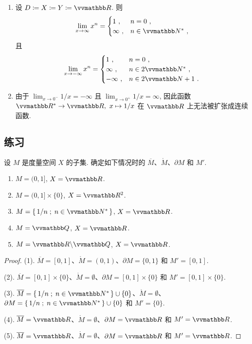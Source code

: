 \begin{example}
\begin{enumerate}
\begin{proof}
        \end{proof}
        \item 设 \(D \coloneqq X \coloneqq Y \coloneqq \R\). 则
        \[
            \lim_{x \to \infty} x^n =
            \begin{cases}
                1\ ,      & n = 0\ , \\
                \infty\ , & n \in \N^\ast\ ,
            \end{cases}
        \]
        且
        \[
            \lim_{x \to - \infty} x^n =
            \begin{cases}
                1\ ,        & n = 0\ , \\
                \infty\ ,   & n \in 2 \N^\ast\ , \\
                - \infty\ , & n \in 2 \N + 1\ .
            \end{cases}
        \]
        \item 由于 \(\lim_{x \to 0^-} 1 / x = - \infty\) 且 \(\lim_{x \to 0^+} 1 / x = \infty\), 因此函数 \(\R^\ast \to \R,\ x \mapsto 1 / x\) 在 \(\R\) 上无法被扩张成连续函数.
    \end{enumerate}
\end{example}

\subsection{练习}

\begin{exercise}
    设 \(M\) 是度量空间 \(X\) 的子集. 确定如下情况时的 \(\overline M\)、\(\mathring M\)、\(\partial M\) 和 \(M'\).
    \begin{enumerate}
        \item \(M = (0, 1]\), \(X = \R\).
        \item \(M = (0, 1] \times \{0\}\), \(X = \R^2\).
        \item \(M = \{\, 1 / n \;;\; n \in \N^\ast \,\}\), \(X = \R\).
        \item \(M = \Q\), \(X = \R\).
        \item \(M = \R \backslash \Q\), \(X = \R\).
    \end{enumerate}
\end{exercise}

\begin{proof}
    (1). \(\overline M = [0, 1]\)、\(\mathring M = (0, 1)\)、\(\partial M = \{0, 1\}\) 和 \(M' = [0, 1]\).

    (2). \(\overline M = [0, 1] \times \{0\}\)、\(\mathring M = \emptyset\)、\(\partial M = [0, 1] \times \{0\}\) 和 \(M' = [0, 1] \times \{0\}\).

    (3). \(\overline M = \{\, 1 / n \;;\; n \in \N^\ast \,\} \cup \{0\}\)、\(\mathring M = \emptyset\)、\(\partial M = \{\, 1 / n \;;\; n \in \N^\ast \,\} \cup \{0\}\) 和 \(M' = \{0\}\).

    (4). \(\overline M = \R\)、\(\mathring M = \emptyset\)、\(\partial M = \R\) 和 \(M' = \R\).

    (5). \(\overline M = \R\)、\(\mathring M = \emptyset\)、\(\partial M = \R\) 和 \(M' = \R\).
\end{proof}

